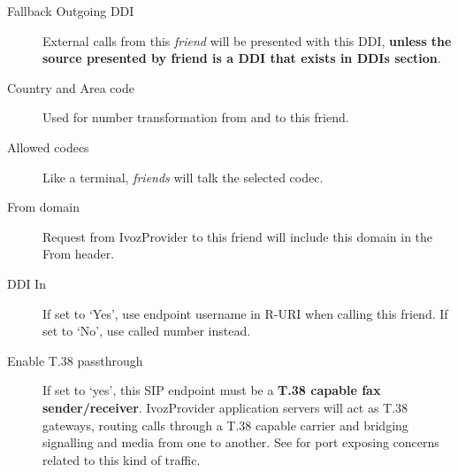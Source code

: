 \documentclass[letterpaper,10pt,english]{sphinxmanual}
\begin{document}
\begin{description}
\item[{Fallback Outgoing DDI}] \leavevmode{}\label{administration_portal/client/vpbx/routing_endpoints/friends/remote_friends:term-fallback-outgoing-ddi}
External calls from this \emph{friend} will be presented with this DDI, \textbf{unless
the source presented by friend is a DDI that exists in DDIs section}.

\item[{Country and Area code}] \leavevmode{}\label{administration_portal/client/vpbx/routing_endpoints/friends/remote_friends:term-country-and-area-code}
Used for number transformation from and to this friend.

\item[{Allowed codecs}] \leavevmode{}\label{administration_portal/client/vpbx/routing_endpoints/friends/remote_friends:term-allowed-codecs}
Like a terminal, \emph{friends} will talk the selected codec.

\item[{From domain}] \leavevmode{}\label{administration_portal/client/vpbx/routing_endpoints/friends/remote_friends:term-from-domain}
Request from IvozProvider to this friend will include this domain in
the From header.

\item[{DDI In}] \leavevmode{}\label{administration_portal/client/vpbx/routing_endpoints/friends/remote_friends:term-ddi-in}
If set to `Yes', use endpoint username in R-URI when calling this friend. If set to `No', use called
number instead.

\item[{Enable T.38 passthrough}] \leavevmode{}\label{administration_portal/client/vpbx/routing_endpoints/friends/remote_friends:term-enable-t-38-passthrough}
If set to `yes', this SIP endpoint must be a \textbf{T.38 capable fax sender/receiver}. IvozProvider
application servers will act as T.38 gateways, routing calls through a T.38 capable carrier and
bridging signalling and media from one to another. See {\hyperref[security_and_maintenance/security/firewall:firewall]{}} for port exposing concerns
related to this kind of traffic.

\end{description}
\end{document}

